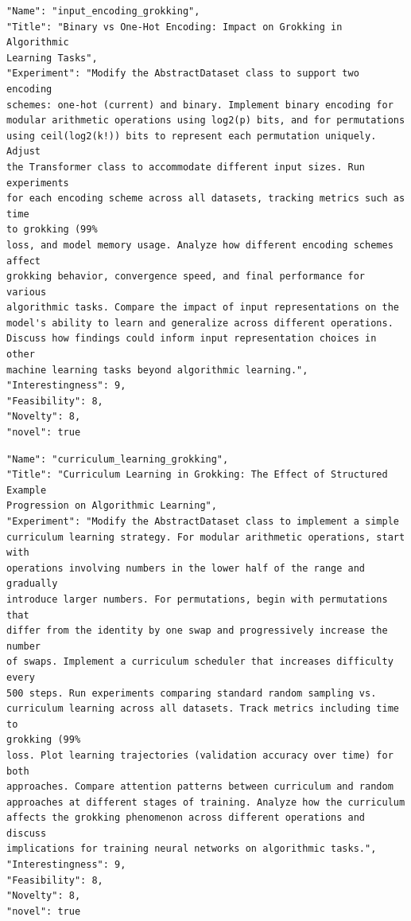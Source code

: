 \begin{tcolorbox}[breakable,colback=blue!5!white, colframe=blue!75!black, title=Idea 7/50 - \texttt{input\_encoding\_grokking}]
\small
\begin{verbatim}
"Name": "input_encoding_grokking",
"Title": "Binary vs One-Hot Encoding: Impact on Grokking in Algorithmic
Learning Tasks",
"Experiment": "Modify the AbstractDataset class to support two encoding
schemes: one-hot (current) and binary. Implement binary encoding for
modular arithmetic operations using log2(p) bits, and for permutations
using ceil(log2(k!)) bits to represent each permutation uniquely. Adjust
the Transformer class to accommodate different input sizes. Run experiments
for each encoding scheme across all datasets, tracking metrics such as time
to grokking (99%
loss, and model memory usage. Analyze how different encoding schemes affect
grokking behavior, convergence speed, and final performance for various
algorithmic tasks. Compare the impact of input representations on the
model's ability to learn and generalize across different operations.
Discuss how findings could inform input representation choices in other
machine learning tasks beyond algorithmic learning.",
"Interestingness": 9,
"Feasibility": 8,
"Novelty": 8,
"novel": true
\end{verbatim}
\end{tcolorbox}

\begin{tcolorbox}[breakable,colback=blue!5!white, colframe=blue!75!black, title=Idea 8/50 - \texttt{curriculum\_learning\_grokking}]
\small
\begin{verbatim}
"Name": "curriculum_learning_grokking",
"Title": "Curriculum Learning in Grokking: The Effect of Structured Example
Progression on Algorithmic Learning",
"Experiment": "Modify the AbstractDataset class to implement a simple
curriculum learning strategy. For modular arithmetic operations, start with
operations involving numbers in the lower half of the range and gradually
introduce larger numbers. For permutations, begin with permutations that
differ from the identity by one swap and progressively increase the number
of swaps. Implement a curriculum scheduler that increases difficulty every
500 steps. Run experiments comparing standard random sampling vs.
curriculum learning across all datasets. Track metrics including time to
grokking (99%
loss. Plot learning trajectories (validation accuracy over time) for both
approaches. Compare attention patterns between curriculum and random
approaches at different stages of training. Analyze how the curriculum
affects the grokking phenomenon across different operations and discuss
implications for training neural networks on algorithmic tasks.",
"Interestingness": 9,
"Feasibility": 8,
"Novelty": 8,
"novel": true
\end{verbatim}
\end{tcolorbox}

